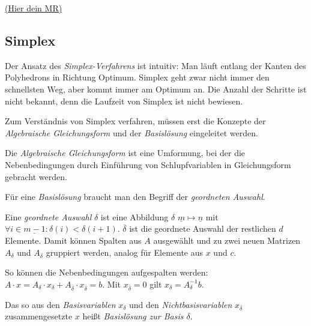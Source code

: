 \documentclass{panikzettel}
\newcommand{\mrhere}[1]{\hyperref[mrExp:#1]{\hypertarget{mr:#1}{\small\sffamily(Hier dein MR)}}}
\begin{document}
\mrhere{lp-geo}

\subsection{Simplex}

Der Ansatz des \emph{Simplex-Verfahrens} ist intuitiv: Man läuft entlang der Kanten des Polyhedrons in Richtung Optimum.
Simplex geht zwar nicht immer den schnellsten Weg, aber kommt immer am Optimum an.
Die Anzahl der Schritte ist nicht bekannt, denn die Laufzeit von Simplex ist nicht bewiesen.

Zum Verständnis von Simplex verfahren, müssen erst die Konzepte der \emph{Algebraische Gleichungsform} und der \emph{Basislösung} eingeleitet werden.

\begin{halfboxl}
Die \emph{Algebraische Gleichungsform} ist eine Umformung, bei der die Nebenbedingungen durch Einführung von Schlupfvariablen in Gleichungsform gebracht werden.

Für eine \emph{Basislösung} braucht man den Begriff der \emph{geordneten Auswahl}.

Eine \emph{geordnete Auswahl} $\delta$ ist eine Abbildung $\delta$ $\underline{m} \mapsto \underline{n}$ mit $\forall i \in \underline{m-1} : \delta(i) < \delta(i+1)$.
$\overline{\delta}$ ist die geordnete Auswahl der restlichen $d$ Elemente.
Damit können Spalten aus $A$ ausgewählt und zu zwei neuen Matrizen $A_\delta$ und $A_{\overline{\delta}}$ gruppiert werden, analog für Elemente aus $x$ und $c$.

So können die Nebenbedingungen aufgespalten werden: $A \cdot x = A_{\delta} \cdot x_{\delta} + A_{\overline{\delta}} \cdot x_{\overline{\delta}} = b$.
Mit $x_{\overline{\delta}} = 0$ gilt $x_{\delta} = A_{\delta}^{-1} b$.

Das so aus den \emph{Basisvariablen} $x_{\delta}$ und den \emph{Nichtbasisvariablen} $x_{\overline{\delta}}$ zusammengesetzte $x$ heißt \emph{Basislösung zur Basis $\delta$}.

\end{halfboxl}%
\end{document}
